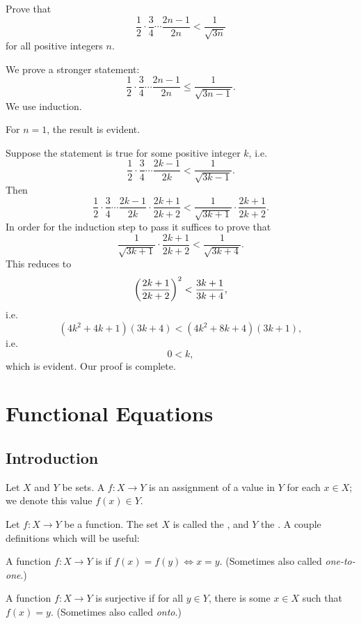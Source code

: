 \begin{prbm}
Prove that
\[ \frac{1}{2}\cdot\frac{3}{4}\cdots\frac{2n-1}{2n}<\frac{1}{\sqrt{3n}} \]
for all positive integers $n$.
\end{prbm}

\begin{solution}
We prove a stronger statement:
\[ \frac{1}{2}\cdot\frac{3}{4}\cdots\frac{2n-1}{2n}\le\frac{1}{\sqrt{3n-1}}. \]
We use induction.

For $n=1$, the result is evident.

Suppose the statement is true for some positive integer $k$, i.e.
\[ \frac{1}{2}\cdot\frac{3}{4}\cdots\frac{2k-1}{2k}<\frac{1}{\sqrt{3k-1}}. \]
Then
\[ \frac{1}{2}\cdot\frac{3}{4}\cdots\frac{2k-1}{2k}\cdot\frac{2k+1}{2k+2}<\frac{1}{\sqrt{3k+1}}\cdot\frac{2k+1}{2k+2}. \]
In order for the induction step to pass it suffices to prove that
\[ \frac{1}{\sqrt{3k+1}}\cdot\frac{2k+1}{2k+2}<\frac{1}{\sqrt{3k+4}}. \]
This reduces to
\[ \left(\frac{2k+1}{2k+2}\right)^2<\frac{3k+1}{3k+4}, \]
i.e.
\[ (4k^2+4k+1)(3k+4)<(4k^2+8k+4)(3k+1), \]
i.e.
\[ 0<k, \]
which is evident. Our proof is complete.
\end{solution}

\chapter{Functional Equations}
\section{Introduction}
\begin{definition}[Function]
Let $X$ and $Y$ be sets. A  $f:X\to Y$ is an assignment of a value in $Y$ for each $x \in X$; we denote this value $f(x) \in Y$.
\end{definition}

Let $f:X\to Y$ be a function. The set $X$ is called the , and $Y$ the . A couple definitions which will be useful:

\begin{definition}[Injectivity]
A function $f:X\to Y$ is  if $f(x)=f(y) \iff x=y$. (Sometimes also called \textit{one-to-one}.)
\end{definition}

\begin{definition}[Surjectivity]
A function $f:X\to Y$ is surjective if for all $y \in Y$, there is some $x \in X$ such that $f(x)=y$. (Sometimes also called \textit{onto}.)
\end{definition}

